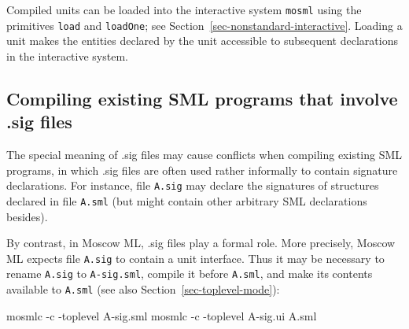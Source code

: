 \documentclass[fleqn,a4paper]{article}
\begin{document}
Compiled units can be loaded into the interactive system {\tt mosml}
using the primitives {\tt load} and \texttt{loadOne}; see
Section~\ref{sec-nonstandard-interactive}.  Loading a unit makes the
entities declared by the unit accessible to subsequent declarations in
the interactive system.


\subsection{Compiling existing SML programs that involve .sig files}

The special meaning of .sig files may cause conflicts when compiling
existing SML programs, in which .sig files are often used rather
informally to contain signature declarations.  For instance, file
\texttt{A.sig} may declare the signatures of structures declared in
file \texttt{A.sml} (but might contain other arbitrary SML
declarations besides).

By contrast, in Moscow ML, .sig files play a formal role.  More
precisely, Moscow ML expects file \texttt{A.sig} to contain a unit
interface.  Thus it may be necessary to rename \texttt{A.sig} to
\texttt{A-sig.sml}, compile it before \texttt{A.sml}, and make its
contents available to \texttt{A.sml} (see also
Section~\ref{sec-toplevel-mode}):

\begin{program}
mosmlc -c -toplevel A-sig.sml
mosmlc -c -toplevel A-sig.ui A.sml
\end{program}





\end{document}
